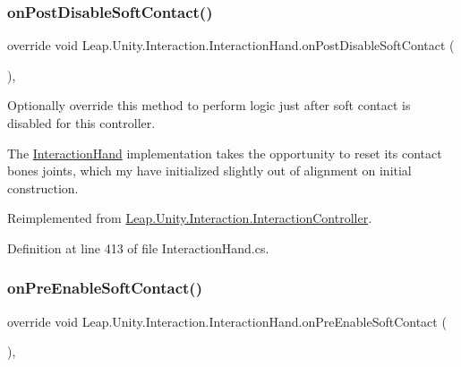 \subsubsection{\texorpdfstring{onPostDisableSoftContact()}{onPostDisableSoftContact()}}
{\footnotesize\ttfamily override void Leap.\+Unity.\+Interaction.\+Interaction\+Hand.\+on\+Post\+Disable\+Soft\+Contact (\begin{DoxyParamCaption}{ }\end{DoxyParamCaption})\hspace{0.3cm}{\ttfamily [protected]}, {\ttfamily [virtual]}}



Optionally override this method to perform logic just after soft contact is disabled for this controller. 

The \mbox{\hyperlink{class_leap_1_1_unity_1_1_interaction_1_1_interaction_hand}{Interaction\+Hand}} implementation takes the opportunity to reset its contact bone\textquotesingle{}s joints, which my have initialized slightly out of alignment on initial construction. 

Reimplemented from \mbox{\hyperlink{class_leap_1_1_unity_1_1_interaction_1_1_interaction_controller_ad9c7c365e25236d6c2441d60d9ce6130}{Leap.\+Unity.\+Interaction.\+Interaction\+Controller}}.



Definition at line 413 of file Interaction\+Hand.\+cs.

\mbox{\label{class_leap_1_1_unity_1_1_interaction_1_1_interaction_hand_a5fe00b0f12a6e91eecdf6472b2fa0775}} 
\subsubsection{\texorpdfstring{onPreEnableSoftContact()}{onPreEnableSoftContact()}}
{\footnotesize\ttfamily override void Leap.\+Unity.\+Interaction.\+Interaction\+Hand.\+on\+Pre\+Enable\+Soft\+Contact (\begin{DoxyParamCaption}{ }\end{DoxyParamCaption})\hspace{0.3cm}{\ttfamily [protected]}, {\ttfamily [virtual]}}



